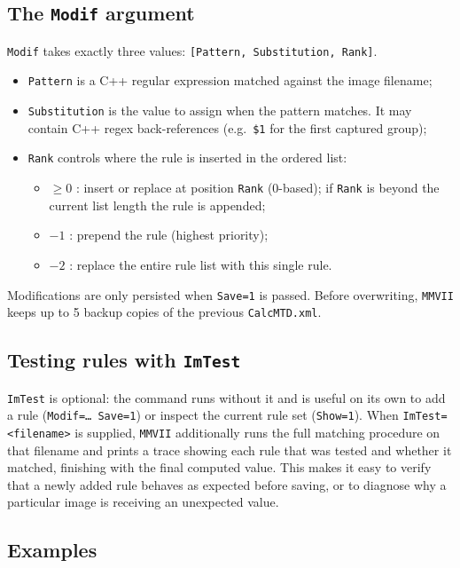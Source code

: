 \subsection{The \texttt{Modif} argument}

{\tt Modif} takes exactly three values: {\tt [Pattern, Substitution, Rank]}.

\begin{itemize}
	\item {\tt Pattern} is a C++ regular expression matched against the image filename;

	\item {\tt Substitution} is the value to assign when the pattern matches.
	It may contain C++ regex back-references (e.g.\ {\tt \$1} for the first
	captured group);

	\item {\tt Rank} controls where the rule is inserted in the ordered list:
	\begin{itemize}
		\item $\geq 0$ : insert or replace at position {\tt Rank} (0-based); if {\tt Rank}
		is beyond the current list length the rule is appended;
		\item $-1$ : prepend the rule (highest priority);
		\item $-2$ : replace the entire rule list with this single rule.
	\end{itemize}
\end{itemize}

Modifications are only persisted when {\tt Save=1} is passed.  Before overwriting,
{\tt MMVII} keeps up to 5 backup copies of the previous {\tt CalcMTD.xml}.

\subsection{Testing rules with \texttt{ImTest}}

{\tt ImTest} is optional: the command runs without it and is useful on its own
to add a rule ({\tt Modif=\dots~Save=1}) or inspect the current rule set ({\tt Show=1}).
When {\tt ImTest=<filename>} is supplied, {\tt MMVII} additionally runs the full
matching procedure on that filename and prints a trace showing each rule that was
tested and whether it matched, finishing with the final computed value.
This makes it easy to verify that a newly added rule behaves as expected before
saving, or to diagnose why a particular image is receiving an unexpected value.

\subsection{Examples}

